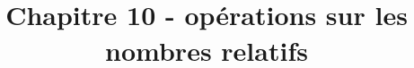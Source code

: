 \documentclass[paper=a4, fontsize=10pt]{scrartcl} %
\title{	
  \vspace{-10ex}
  \horrule{0.5pt} \\[0.4cm] %
  \huge Chapitre 10 - opérations sur les nombres relatifs\\ %
  \horrule{2pt} \\[0.5cm] %
}
\author{}
\date{\vspace{-10ex}} %
\begin{document}

\newtheorem{Definition}{Définition}
\newtheorem{Theorem}{Théorème}
\newtheorem{Proposition}{Proposition}

\renewcommand{\labelitemi}{$\bullet$}
\renewcommand{\labelitemii}{$\circ$}

\maketitle %


\end{document}
